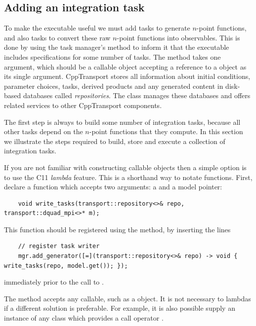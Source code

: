 \documentclass[11pt,a4paper]{article}
\renewcommand{\texttt}[1]{{\ttfamily\fontseries{l}\selectfont{#1}}}
\newcounter{advancedbox}[section]
\newenvironment{advanced}[1]{\stepcounter{advancedbox}\begin{tcolorbox}[enhanced,breakable,colback=red!10,colbacktitle=red!20,colframe=red!40,coltitle=black,title={Advanced usage: {#1}},fonttitle=\sffamily\fontseries{b}\selectfont]}{\end{tcolorbox}}
\newcommand{\packagefont}{\sffamily}
\newcommand{\CppTransport}{{\packagefont CppTransport}}
\newcommand{\file}[1]{\texttt{{#1}}}
\newcommand\CC{C\nolinebreak\hspace{-.05em}\raisebox{.4ex}{\relsize{-3}{\textbf{+}}}\nolinebreak\hspace{-.10em}\raisebox{.4ex}{\relsize{-3}{\textbf{+}}}}
\begin{document}
\subsection{Adding an integration task}
\label{sec:add-integration-task}
To make the executable \file{dquad} useful we must add tasks to generate
$n$-point functions, and also tasks to convert these raw $n$-point
functions into observables.
This is done by using the task manager's
\texttt{add_generator()}
method to inform it that the executable includes specifications
for some number of
tasks.
The \texttt{add_generator()}
method takes one argument, which should be a callable
object accepting a reference to
a \texttt{transport::repository<>}
object as its single argument.
{\CppTransport} stores all information about
initial conditions, parameter choices, tasks,
derived products and any generated content
in disk-based databases called \emph{repositories}.
The \texttt{repository<>} class manages
these databases and offers related services
to other
{\CppTransport} components.

The first step is always to build some number of integration tasks,
because all other tasks depend on the $n$-point functions that they compute.
In this section we illustrate the steps required to build, store and
execute a collection of integration tasks.

If you are not familiar with constructing callable objects
then a simple option is to use the {\CC}11 \emph{lambda} feature.
This is a shorthand way to notate functions.
First,  declare a function
\texttt{write_tasks()} which accepts
two arguments:
a \texttt{repository<>} and a model pointer:
\begin{verbatim}
    void write_tasks(transport::repository<>& repo, transport::dquad_mpi<>* m);
\end{verbatim}
This function should be registered using the
\texttt{add_generator()} method,
by inserting the lines
\begin{verbatim}
    // register task writer
    mgr.add_generator([=](transport::repository<>& repo) -> void { write_tasks(repo, model.get()); });
\end{verbatim}
immediately prior to the call to
\texttt{mgr.process()}.
\begin{advanced}{Callable objects}
    The \texttt{add_generator()} method accepts any callable,
    such as a \texttt{std::function<>} object.
    It is not necessary to lambdas
    if a different solution is preferable.
    For example, it is also possible supply an instance of any
    class which provides a call operator
    \texttt{operator()}.
\end{advanced}
\end{document}
